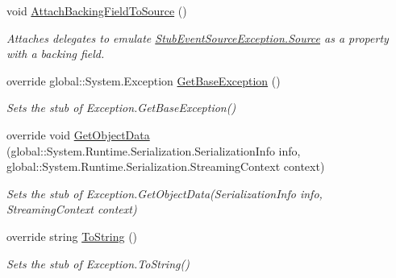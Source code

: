 \begin{DoxyCompactItemize}
void \hyperlink{class_system_1_1_diagnostics_1_1_tracing_1_1_fakes_1_1_stub_event_source_exception_a4ed1b218dfcbe025d9c1840fdb7f64c9}{Attach\-Backing\-Field\-To\-Source} ()
\begin{DoxyCompactList}\small\item\em Attaches delegates to emulate \hyperlink{class_system_1_1_diagnostics_1_1_tracing_1_1_fakes_1_1_stub_event_source_exception_a887515c4d50505c4922e1f0651c3bfe3}{Stub\-Event\-Source\-Exception.\-Source} as a property with a backing field.\end{DoxyCompactList}\item 
override global\-::\-System.\-Exception \hyperlink{class_system_1_1_diagnostics_1_1_tracing_1_1_fakes_1_1_stub_event_source_exception_a365c7c39534792a4034266b543c1a946}{Get\-Base\-Exception} ()
\begin{DoxyCompactList}\small\item\em Sets the stub of Exception.\-Get\-Base\-Exception()\end{DoxyCompactList}\item 
override void \hyperlink{class_system_1_1_diagnostics_1_1_tracing_1_1_fakes_1_1_stub_event_source_exception_af32d889034f737cc19cf52d93127cd68}{Get\-Object\-Data} (global\-::\-System.\-Runtime.\-Serialization.\-Serialization\-Info info, global\-::\-System.\-Runtime.\-Serialization.\-Streaming\-Context context)
\begin{DoxyCompactList}\small\item\em Sets the stub of Exception.\-Get\-Object\-Data(\-Serialization\-Info info, Streaming\-Context context)\end{DoxyCompactList}\item 
override string \hyperlink{class_system_1_1_diagnostics_1_1_tracing_1_1_fakes_1_1_stub_event_source_exception_ad05c311abec46bae9ff2a479d0ef91c5}{To\-String} ()
\begin{DoxyCompactList}\small\item\em Sets the stub of Exception.\-To\-String()\end{DoxyCompactList}\end{DoxyCompactItemize}
